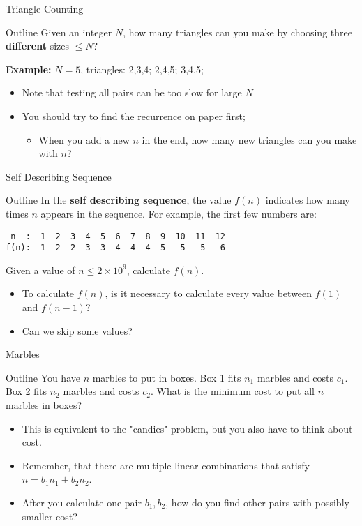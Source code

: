 \begin{frame}{Triangle Counting}
  \begin{block}{Outline}
    Given an integer $N$, how many triangles can you make by choosing three {\bf different} sizes $\leq N$?\bigskip

    {\bf Example:} $N = 5$, triangles: 2,3,4; 2,4,5; 3,4,5;
  \end{block}\bigskip

  \begin{itemize}
    \item Note that testing all pairs can be too slow for large $N$
    \item You should try to find the recurrence on paper first;
    \begin{itemize}
      \item When you add a new $n$ in the end, how many new triangles can you make with $n$?
    \end{itemize}
  \end{itemize}
\end{frame}

\begin{frame}[fragile]{Self Describing Sequence}
  \begin{block}{Outline}
    In the {\bf self describing sequence}, the value $f(n)$ indicates how many times $n$ appears in the sequence. For example, the first few numbers are:

    \begin{verbatim}
 n  :  1  2  3  4  5  6  7  8  9  10  11  12
f(n):  1  2  2  3  3  4  4  4  5   5   5   6
    \end{verbatim}

    Given a value of $n \leq 2\times10^9$, calculate $f(n)$.
  \end{block}\bigskip

  \begin{itemize}
    \item To calculate $f(n)$, is it necessary to calculate every value between $f(1)$ and $f(n-1)$?
    \item Can we skip some values?
  \end{itemize}
\end{frame}

\begin{frame}{Marbles}
  \begin{block}{Outline}
    You have $n$ marbles to put in boxes. Box 1 fits $n_1$ marbles and costs $c_1$. Box 2 fits $n_2$ marbles and costs $c_2$. What is the minimum cost to put all $n$ marbles in boxes?
  \end{block}\bigskip

  \begin{itemize}
    \item This is equivalent to the "candies" problem, but you also have to think about cost.
    \item Remember, that there are multiple linear combinations that satisfy $n = b_1n_1 + b_2n_2$.
    \item After you calculate one pair $b_1,b_2$, how do you find other pairs with possibly smaller cost?
  \end{itemize}
\end{frame}


%
